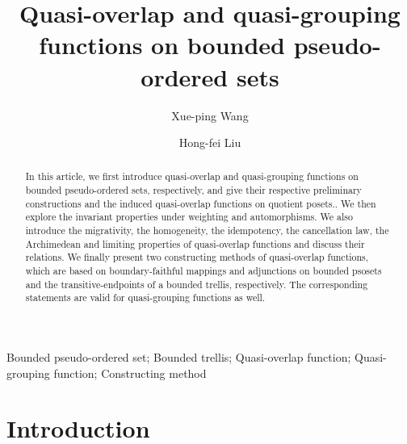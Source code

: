 \documentclass[preprint,12pt]{elsarticle}
\def\corref#1{}%
\begin{document}
\begin{frontmatter}

\title{\textbf{Quasi-overlap and quasi-grouping functions on bounded pseudo-ordered sets}
}


\author{Xue-ping Wang\corref{cor1}}

\author{Hong-fei Liu}

\address{School of Mathematical Sciences, Sichuan Normal University, Chengdu 610066, Sichuan, People's Republic of China}

\begin{abstract}
In this article, we first introduce quasi-overlap and quasi-grouping functions on bounded pseudo-ordered sets, respectively, and give their respective preliminary constructions and the induced quasi-overlap functions on quotient posets.. We then explore the invariant properties under weighting and automorphisms. We also introduce the migrativity, the homogeneity, the idempotency, the cancellation law, the Archimedean and limiting properties of quasi-overlap functions and discuss their relations. We finally present two constructing methods of quasi-overlap functions, which are based on boundary-faithful mappings and adjunctions on bounded psosets and the transitive-endpoints of a bounded trellis, respectively. The corresponding statements are valid for quasi-grouping functions as well.
\end{abstract}

\begin{keyword}
Bounded pseudo-ordered set; Bounded trellis; Quasi-overlap function; Quasi-grouping function; Constructing method
\end{keyword}

\end{frontmatter}

\section{Introduction}
\end{document}
